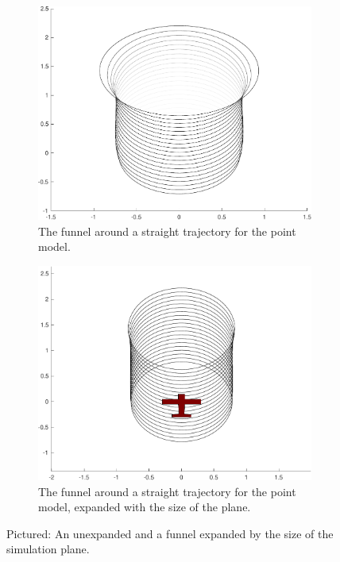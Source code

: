 \begin{figure}
  \begin{subfigure}{0.5\textwidth}
    \includegraphics[width=\textwidth]{figures/experiments/unexpanded-funnel}
    \caption{The funnel around a straight trajectory for the point
      model.\newline}
  \end{subfigure}%
  \;
  \begin{subfigure}{0.5\textwidth}
    \includegraphics[width=\textwidth]{figures/experiments/expanded-funnel-with-plane}
    \caption{The funnel around a straight trajectory for the point model,
      expanded with the size of the plane.}
  \end{subfigure}
  \caption{Pictured: An unexpanded and a funnel expanded by the size of the
    simulation plane.}
  \label{fig:expanded-and-unexpanded}
\end{figure}

